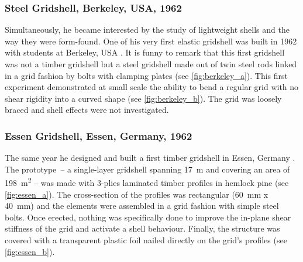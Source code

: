 
\subsubsection{Steel Gridshell, Berkeley, USA, 1962}
Simultaneously, he became interested by the study of lightweight shells and the way they were form-found. One of his very first elastic gridshell was built in 1962 with students at Berkeley, USA \cite[p.~270]{IL10}. It is funny to remark that this first gridshell was not a timber gridshell but a steel gridshell made out of twin steel rods linked in a grid fashion by bolts with clamping plates (see \cref{fig:berkeley_a}). This first experiment demonstrated at small scale the ability to bend a regular grid with no shear rigidity into a curved shape  (see \cref{fig:berkeley_b}). The grid was loosely braced and shell effects were not investigated.

\subsubsection{Essen Gridshell, Essen, Germany, 1962}
The same year he designed and built a first timber gridshell in Essen, Germany \cite[p.~272]{IL10}. The prototype~-- a single-layer gridshell spanning \SI{17}{m} and covering an area of \SI{198}{m^2} -- was made with 3-plies laminated timber profiles in hemlock pine (see \cref{fig:essen_a}). The cross-section of the profiles was rectangular (\SI{60}{mm} x \SI{40}{mm}) and the elements were assembled in a grid fashion with simple steel bolts. Once erected, nothing was specifically done to improve the in-plane shear stiffness of the grid and activate a shell behaviour. Finally, the structure was covered with a transparent plastic foil nailed directly on the grid's profiles (see \cref{fig:essen_b}).


